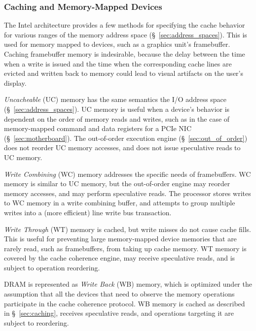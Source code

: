\subsubsection{Caching and Memory-Mapped Devices}
\label{sec:memory_io}
\label{sec:cacheability_config}

The Intel architecture provides a few methods for specifying the cache behavior
for various ranges of the memory address space (\S~\ref{sec:address_spaces}).
This is used for memory mapped to devices, such as a graphics unit's
framebuffer. Caching framebuffer memory is indesirable, because the delay
between the time when a write is issued and the time when the corresponding
cache lines are evicted and written back to memory could lead to visual
artifacts on the user's display.


\textit{Uncacheable} (UC) memory has the same semantics the I/O address space
(\S~\ref{sec:address_spaces}). UC memory is useful when a device's behavior is
dependent on the order of memory reads and writes, such as in the case of
memory-mapped command and data registers for a PCIe NIC
(\S~\ref{sec:motherboard}). The out-of-order execution engine
(\S~\ref{sec:out_of_order}) does not reorder UC memory accesses, and does not
issue speculative reads to UC memory.

\textit{Write Combining} (WC) memory addresses the specific needs of
framebuffers. WC memory is similar to UC memory, but the out-of-order engine
may reorder memory accesses, and may perform speculative reads. The processor
stores writes to WC memory in a write combining buffer, and attempts to group
multiple writes into a (more efficient) line write bus transaction.

\textit{Write Through} (WT) memory is cached, but write misses do not cause
cache fills. This is useful for preventing large memory-mapped device memories
that are rarely read, such as framebuffers, from taking up cache memory. WT
memory is covered by the cache coherence engine, may receive speculative reads,
and is subject to operation reordering.

DRAM is represented as \textit{Write Back} (WB) memory, which is optimized
under the assumption that all the devices that need to observe the memory
operations participate in the cache coherence protocol. WB memory is cached as
described in \S~\ref{sec:caching}, receives speculative reads, and operations
targeting it are subject to reordering.

